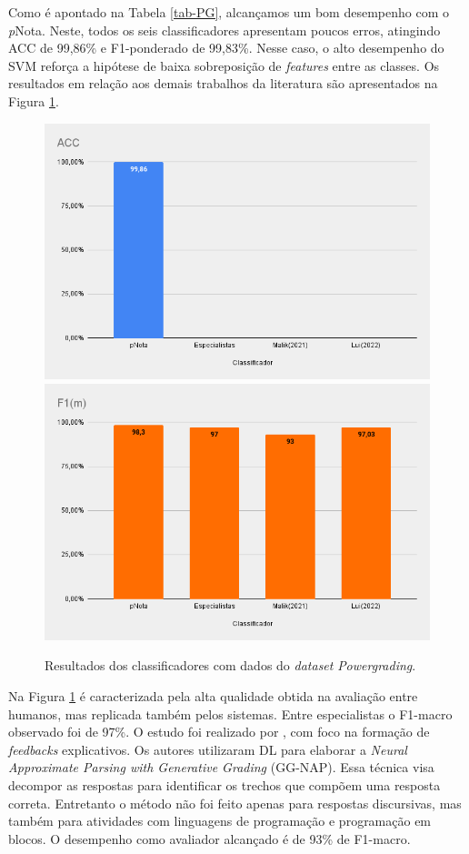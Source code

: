 Como é apontado na Tabela \ref{tab-PG}, alcançamos um bom desempenho com o \textit{p}Nota. Neste, todos os seis classificadores apresentam poucos erros, atingindo ACC de 99,86\% e F1-ponderado de 99,83\%. Nesse caso, o alto desempenho do SVM reforça a hipótese de baixa sobreposição de \textit{features} entre as classes. Os resultados em relação aos demais trabalhos da literatura são apresentados na Figura \ref{fig-PG}.

\begin{figure}[!h]
\centering
\includegraphics[width=.6\textwidth]{figuras/Powergrading/res-pg-acc.png}
\includegraphics[width=.6\textwidth]{figuras/Powergrading/res-pg-mfs.png}
\caption{Resultados dos classificadores com dados do \textit{dataset} \textit{Powergrading}.}
\label{fig-PG}
\end{figure}

Na Figura \ref{fig-PG} é caracterizada pela alta qualidade obtida na avaliação entre humanos, mas replicada também pelos sistemas. Entre especialistas o F1-macro observado foi de 97\%. O estudo foi realizado por \cite{malik2021}, com foco na formação de \textit{feedbacks} explicativos. Os autores utilizaram DL para elaborar a \textit{Neural Approximate Parsing with Generative Grading} (GG-NAP). Essa técnica visa decompor as respostas para identificar os trechos que compõem uma resposta correta. Entretanto o método não foi feito apenas para respostas discursivas, mas também para atividades com linguagens de programação e programação em blocos. O desempenho como avaliador alcançado é de 93\% de F1-macro. 


